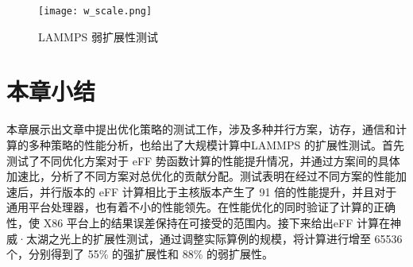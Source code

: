   \begin{figure}[h]
  \centering
  \texttt{[image: w\_scale.png]}
  \caption{LAMMPS 弱扩展性测试}
\end{figure}

\section{本章小结}
本章展示出文章中提出优化策略的测试工作，涉及多种并行方案，访存，通信和计算的多种策略的性能分析，也给出了大规模计算中LAMMPS 的扩展性测试。首先测试了不同优化方案对于 eFF 势函数计算的性能提升情况，并通过方案间的具体加速比，分析了不同方案对总优化的贡献分配。测试表明在经过不同方案的性能加速后，并行版本的 eFF 计算相比于主核版本产生了 91 倍的性能提升，并且对于通用平台处理器，也有着不小的性能领先。在性能优化的同时验证了计算的正确性，使 X86 平台上的结果误差保持在可接受的范围内。接下来给出eFF 计算在神威·太湖之光上的扩展性测试，通过调整实际算例的规模，将计算进行增至 65536 个，分别得到了 55\% 的强扩展性和 88\% 的弱扩展性。
